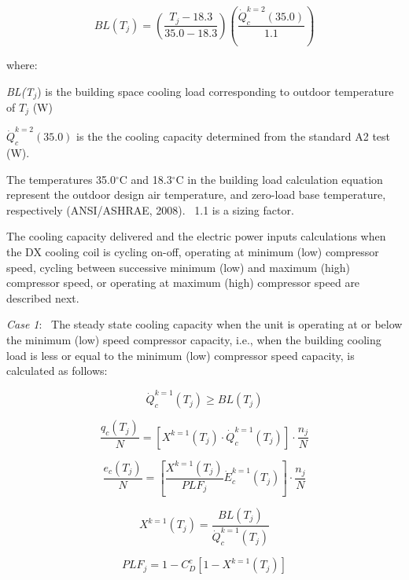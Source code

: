 \begin{equation}
BL({T_j}) = \left( {\frac{{{T_j} - 18.3}}{{35.0 - 18.3}}} \right)\left( {\frac{{\dot Q_c^{k = 2}(35.0)}}{{1.1}}} \right)
\end{equation}

where:

\emph{BL(T}\(_{j}\)) is the building space cooling load corresponding to outdoor temperature of \(T_{j}\) (W)

\(\dot Q_c^{k = 2}(35.0)\) is the the cooling capacity determined from the standard A2 test (W).

The temperatures 35.0\(^{\circ}\)C and 18.3\(^{\circ}\)C in the building load calculation equation represent the outdoor design air temperature, and zero-load base temperature, respectively (ANSI/ASHRAE, 2008).~ 1.1 is a sizing factor.

The cooling capacity delivered and the electric power inputs calculations when the DX cooling coil is cycling on-off, operating at minimum (low) compressor speed, cycling between successive minimum (low) and maximum (high) compressor speed, or operating at maximum (high) compressor speed are described next.

\emph{Case 1}:~ The steady state cooling capacity when the unit is operating at or below the minimum (low) speed compressor capacity, i.e., when the building cooling load is less or equal to the minimum (low) compressor speed capacity, is calculated as follows:

\begin{equation}
\dot Q_c^{k = 1}({T_j}) \ge BL({T_j})
\end{equation}

\begin{equation}
\frac{{{q_c}({T_j})}}{N} = \left[ {{X^{k = 1}}({T_j}) \cdot \dot Q_c^{k = 1}({T_j})} \right] \cdot \frac{{{n_j}}}{N}
\end{equation}

\begin{equation}
\frac{{{e_c}({T_j})}}{N} = \left[ {\frac{{{X^{k = 1}}({T_j})}}{{PL{F_j}}}\dot E_c^{k = 1}({T_j})} \right] \cdot \frac{{{n_j}}}{N}
\end{equation}

\begin{equation}
{X^{k = 1}}({T_j}) = \frac{{BL({T_j})}}{{\dot Q_c^{k = 1}({T_j})}}
\end{equation}

\begin{equation}
PL{F_j} = 1 - C_D^c\left[ {1 - {X^{k = 1}}({T_j})} \right]
\end{equation}

